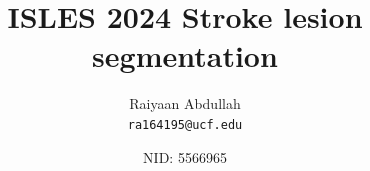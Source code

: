 \documentclass[10pt,twocolumn,letterpaper]{article}
\title{
ISLES 2024 Stroke lesion segmentation
}
\author{Raiyaan Abdullah\\
{\tt\small ra164195@ucf.edu}
\and
NID: 5566965\\
}
\begin{document}
\maketitle
   

{\small


}
\end{document}
